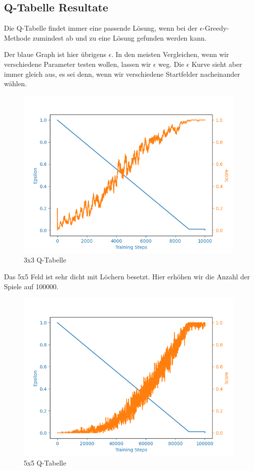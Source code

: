 \subsection{Q-Tabelle Resultate}
\label{subsec:Q-Tabelle_r}

Die Q-Tabelle findet immer eine passende Lösung, wenn bei der $\epsilon$-Greedy-Methode zumindest ab und zu eine Lösung gefunden werden kann.

Der blaue Graph ist hier übrigens  $\epsilon$. In den meisten Vergleichen, wenn wir verschiedene Parameter testen wollen, lassen wir  $\epsilon$ weg. Die  $\epsilon$ Kurve sieht aber immer gleich aus, es sei denn, wenn wir verschiedene Startfelder nacheinander wählen.

\begin{figure}[H]
\centering
\includegraphics[width=\textwidth]{Figures/q_table_3x3.png}
\caption{3x3 Q-Tabelle}
\label{q1}
\end{figure}

Das 5x5 Feld ist sehr dicht mit Löchern besetzt. Hier erhöhen wir die Anzahl der Spiele auf 100000.

\begin{figure}[H]
\centering
\includegraphics[width=\textwidth]{Figures/q_table_5x5.png}
\caption{5x5 Q-Tabelle}
\label{q2}
\end{figure}

